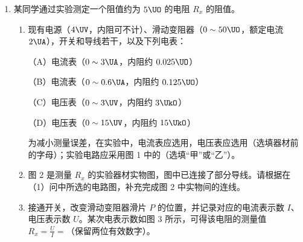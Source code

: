 \documentclass[\gkver]{gaokaozhenti}
\begin{document}
\begin{enumerate}
光电效应实验装置示意如图。用频率为 $\nu$ 的普通光源照射阴极 $K$，没有发生光电效应。换用同样频率为 $\nu$ 的强激光照射阴极 $K$，则发生了光电效应；此时，若加上反向电压 $U$，即将阴极 $K$ 接电源正极，阳极 $A$ 接电源负极，在 $KA$ 之间就形成了使光电子减速的电场，逐渐增大 $U$，光电流会逐渐减小；当光电流恰好减小到零时，所加反向电压 $U$ 可能是下列的（其中 $W$ 为逸出功，$h$ 为普朗克常量，$e$ 为电子电量）
{$U=\frac{2h\nu}{e}-\frac{W}{e}$}
{$U=2h\nu-W$}
{$U=\frac{5h\nu}{2e}-\frac{W}{e}$}

\item
某同学通过实验测定一个阻值约为 $5\UO$ 的电阻 $R_{x}$ 的阻值。
\begin{enumerate}
	\item
	现有电源（$4\UV$，内阻可不计）、滑动变阻器（$0\sim50\UO$，额定电流 $2\UA$），开关和导线若干，以及下列电表：

	（A）电流表（$0\sim3\UA$，内阻约 $0.025\UO$）

	（B）电流表（$0\sim0.6\UA$，内阻约 $0.125\UO$）

	（C）电压表（$0\sim3\UV$，内阻约 $3\UkO$）

	（D）电压表（$0\sim15\UV$，内阻约 $15\UkO$）

	为减小测量误差，在实验中，电流表应选用，电压表应选用（选填器材前的字母）；实验电路应采用图 1 中的（选填“甲”或“乙”）。


	\item
	图 2 是测量 $R_{x}$ 的实验器材实物图，图中已连接了部分导线。请根据在（1）问中所选的电路图，补充完成图 2 中实物间的连线。


	\item
	接通开关，改变滑动变阻器滑片 $P$ 的位置，并记录对应的电流表示数 $I$、电压表示数 $U$。某次电表示数如图 3 所示，可得该电阻的测量值 $R_{x}=\frac{U}{I}=$\tkanswer[1.5cm]{$5.2\UO$}（保留两位有效数字）。



\end{enumerate}
\end{enumerate}
\end{document}
